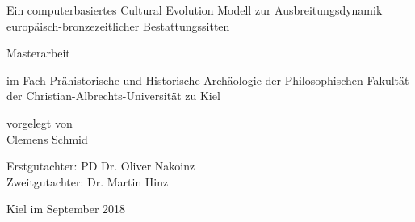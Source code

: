 \begin{titlepage}

  \vspace*{\fill}

    \begin{center}

        \Huge Ein computerbasiertes Cultural Evolution Modell zur Ausbreitungsdynamik europäisch-bronzezeitlicher Bestattungssitten

        \vspace{2cm}

        \huge Masterarbeit

        \large im Fach Prähistorische und Historische Archäologie der Philosophischen Fakultät der Christian-Albrechts-Universität zu Kiel

        \vspace{2cm}

        \large vorgelegt von \\
        \huge Clemens Schmid

    \end{center}

\vspace{4cm}

\large Erstgutachter: PD Dr. Oliver Nakoinz \\
\large Zweitgutachter: Dr. Martin Hinz

\vspace{1cm}

\large Kiel im September 2018

  \vspace*{\fill}

\end{titlepage}
